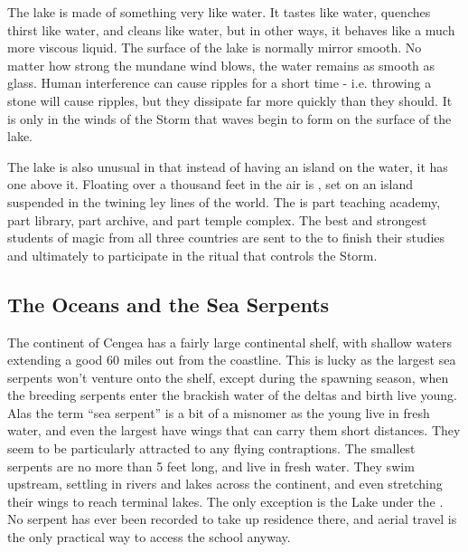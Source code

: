 \documentclass[blue]{GL2020}
\begin{document}
The lake is made of something very like water. It tastes like water, quenches thirst like water, and cleans like water, but in other ways, it behaves like a much more viscous liquid. The surface of the lake is normally mirror smooth. No matter how strong the mundane wind blows, the water remains as smooth as glass. Human interference can cause ripples for a short time - i.e. throwing a stone will cause ripples, but they dissipate far more quickly than they should. It is only in the winds of the Storm that waves begin to form on the surface of the lake.



The lake is also unusual in that instead of having an island on the water, it has one above it. Floating over a thousand feet in the air is \pSchool{}, set on an island suspended in the twining ley lines of the world. The \pSchool{} is part teaching academy, part library, part archive, and part temple complex. The best and strongest students of magic from all three countries are sent to the \pSc{} to finish their studies and ultimately to participate in the ritual that controls the Storm.

\subsection*{The Oceans and the Sea Serpents}
The continent of Cengea has a fairly large continental shelf, with shallow waters extending a good 60 miles out from the coastline. This is lucky as the largest sea serpents won't venture onto the shelf, except during the spawning season, when the breeding serpents enter the brackish water of the deltas and birth live young. Alas the term ``sea serpent'' is a bit of a misnomer as the young live in fresh water, and even the largest have wings that can carry them short distances. They seem to be particularly attracted to any flying contraptions.  The smallest serpents are no more than 5 feet long, and live in fresh water. They swim upstream, settling in rivers and lakes across the continent, and even stretching their wings to reach terminal lakes. The only exception is the Lake under the \pSchool{}. No serpent has ever been recorded to take up residence there, and aerial travel is the only practical way to access the school anyway.
\end{document}
